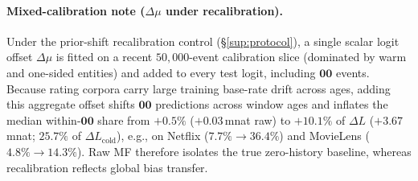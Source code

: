 \documentclass[10pt,letterpaper]{article}
\begin{document}
\paragraph{Mixed-calibration note ($\Delta\mu$ under recalibration).}
Under the prior-shift recalibration control (\S\ref{sup:protocol}), a single scalar
logit offset $\Delta\mu$ is fitted on a recent $50{,}000$-event calibration
slice (dominated by warm and one-sided entities) and added to every test logit,
including $\mathbf{00}$ events. Because rating corpora carry large training
base-rate drift across ages, adding this aggregate offset shifts $\mathbf{00}$
predictions across window ages and inflates the median within-$\mathbf{00}$
share from $+0.5\%$ ($+0.03$\,mnat raw) to $+10.1\%$ of $\Delta L$ ($+3.67$\,mnat;
$25.7\%$ of $\Delta L_{\mathrm{cold}}$), e.g., on Netflix ($7.7\% \to 36.4\%$)
and MovieLens ($4.8\% \to 14.3\%$). Raw MF therefore isolates the true
zero-history baseline, whereas recalibration reflects global bias transfer.
\end{document}
